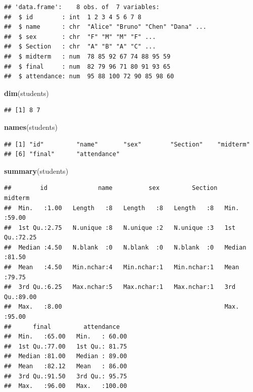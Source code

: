 \documentclass[
]{article}
\newenvironment{Shaded}{\begin{snugshade}}{\end{snugshade}}
\newcommand{\FunctionTok}[1]{\textcolor[rgb]{0.13,0.29,0.53}{\textbf{#1}}}
\newcommand{\NormalTok}[1]{#1}
\begin{document}
\begin{verbatim}
## 'data.frame':    8 obs. of  7 variables:
##  $ id        : int  1 2 3 4 5 6 7 8
##  $ name      : chr  "Alice" "Bruno" "Chen" "Dana" ...
##  $ sex       : chr  "F" "M" "M" "F" ...
##  $ Section   : chr  "A" "B" "A" "C" ...
##  $ midterm   : num  78 85 92 67 74 88 95 59
##  $ final     : num  82 79 96 71 80 91 93 65
##  $ attendance: num  95 88 100 72 90 85 98 60
\end{verbatim}

\begin{Shaded}
\begin{Highlighting}[]
\FunctionTok{dim}\NormalTok{(students)}
\end{Highlighting}
\end{Shaded}

\begin{verbatim}
## [1] 8 7
\end{verbatim}

\begin{Shaded}
\begin{Highlighting}[]
\FunctionTok{names}\NormalTok{(students)}
\end{Highlighting}
\end{Shaded}

\begin{verbatim}
## [1] "id"         "name"       "sex"        "Section"    "midterm"   
## [6] "final"      "attendance"
\end{verbatim}

\begin{Shaded}
\begin{Highlighting}[]
\FunctionTok{summary}\NormalTok{(students)}
\end{Highlighting}
\end{Shaded}

\begin{verbatim}
##        id              name          sex         Section     midterm     
##  Min.   :1.00   Length   :8   Length   :8   Length   :8   Min.   :59.00  
##  1st Qu.:2.75   N.unique :8   N.unique :2   N.unique :3   1st Qu.:72.25  
##  Median :4.50   N.blank  :0   N.blank  :0   N.blank  :0   Median :81.50  
##  Mean   :4.50   Min.nchar:4   Min.nchar:1   Min.nchar:1   Mean   :79.75  
##  3rd Qu.:6.25   Max.nchar:5   Max.nchar:1   Max.nchar:1   3rd Qu.:89.00  
##  Max.   :8.00                                             Max.   :95.00  
##      final         attendance    
##  Min.   :65.00   Min.   : 60.00  
##  1st Qu.:77.00   1st Qu.: 81.75  
##  Median :81.00   Median : 89.00  
##  Mean   :82.12   Mean   : 86.00  
##  3rd Qu.:91.50   3rd Qu.: 95.75  
##  Max.   :96.00   Max.   :100.00
\end{verbatim}
\end{document}
